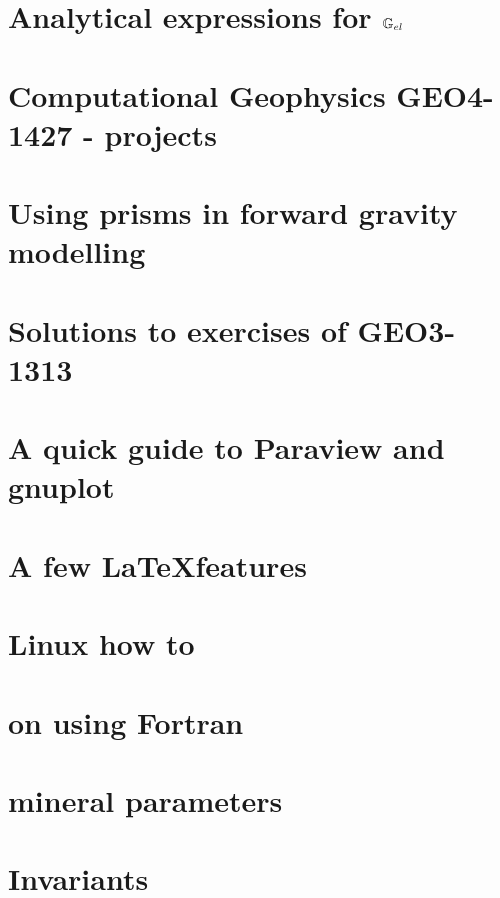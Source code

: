 \documentclass[a4paper,12pt]{report}
\begin{document}
\chapter{Analytical expressions for ${\mathbb{G}}_{el}$} \label{app:Gel}  %
\chapter{Computational Geophysics GEO4-1427 - projects}  %
\chapter{Using prisms in forward gravity modelling \label{app:prisms}}  %
\chapter{Solutions to exercises of GEO3-1313 \label{app:gravsols}}  %
\chapter{A quick guide to Paraview and gnuplot}   %
\chapter{A few \LaTeX features}  %
\chapter{Linux how to}  %
\chapter{on using Fortran}  %
\chapter{mineral parameters}  %
\chapter{Invariants \label{app:invariants}}  %
\end{document}
